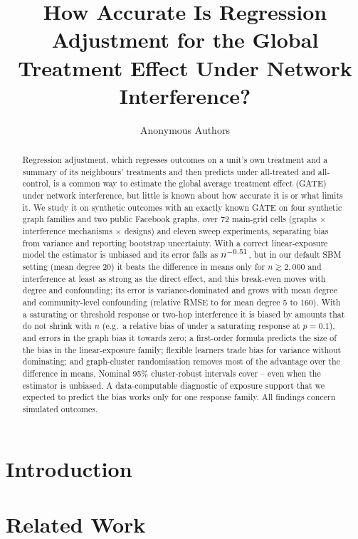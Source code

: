 \documentclass{article}
\title{How Accurate Is Regression Adjustment for the Global Treatment Effect Under Network Interference?}
\author{Anonymous Authors}
\begin{document}
\maketitle

\begin{abstract}
Regression adjustment, which regresses outcomes on a unit's own treatment and a summary of its neighbours' treatments and then predicts under all-treated and all-control, is a common way to estimate the global average treatment effect (GATE) under network interference, but little is known about how accurate it is or what limits it. We study it on synthetic outcomes with an exactly known GATE on four synthetic graph families and two public Facebook graphs, over 72 main-grid cells (graphs $\times$ interference mechanisms $\times$ designs) and eleven sweep experiments, separating bias from variance and reporting bootstrap uncertainty. With a correct linear-exposure model the estimator is unbiased and its error falls as $n^{-0.51}$, but in our default SBM setting (mean degree 20) it beats the difference in means only for $n\gtrsim2{,}000$ and interference at least as strong as the direct effect, and this break-even moves with degree and confounding; its error is variance-dominated and grows with mean degree and community-level confounding (relative RMSE \EtwoSbmLo{} to \EtwoSbmHi{} for mean degree 5 to 160). With a saturating or threshold response or two-hop interference it is biased by amounts that do not shrink with $n$ (e.g.\ a relative bias of \MainThreeBernLowBias{} under a saturating response at $p=0.1$), and errors in the graph bias it towards zero; a first-order formula predicts the size of the bias in the linear-exposure family; flexible learners trade bias for variance without dominating; and graph-cluster randomisation removes most of the advantage over the difference in means. Nominal 95\% cluster-robust intervals cover \CovClMin--\CovClMax{} even when the estimator is unbiased. A data-computable diagnostic of exposure support that we expected to predict the bias works only for one response family. All findings concern simulated outcomes.
\end{abstract}

\section{Introduction}
\label{sec:intro}


\section{Related Work}
\label{sec:related}

\end{document}
